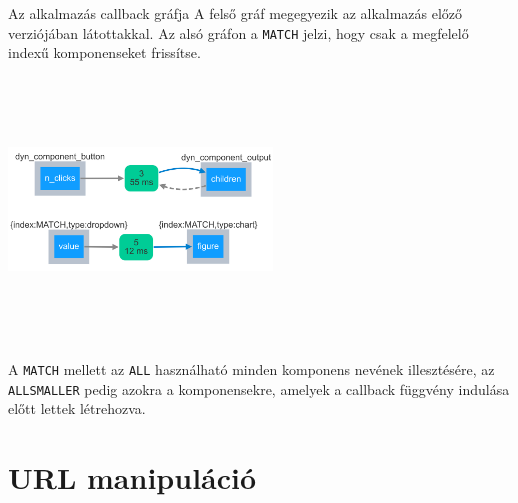 \documentclass[english, aspectratio=169]{beamer}
\makeatletter
\let\origtableofcontents=\tableofcontents
\def\tableofcontents{\@ifnextchar[{\origtableofcontents}{\gobbletableofcontents}}
\def\gobbletableofcontents#1{\origtableofcontents}
\makeatother
\begin{document}
\begin{frame}{Az alkalmazás callback gráfja}
	A felső gráf megegyezik az alkalmazás előző verziójában látottakkal. Az alsó gráfon a \texttt{MATCH} jelzi, hogy csak a megfelelő indexű komponenseket frissítse.\par\medskip
	\begin{center}
		\includegraphics[width=7cm, height=7cm, keepaspectratio]{images/adv_4.png}
	\end{center}
	\par\medskip
	A \texttt{MATCH} mellett az \texttt{ALL} használható minden komponens nevének illesztésére, az \texttt{ALLSMALLER} pedig azokra a komponensekre, amelyek a callback függvény indulása előtt lettek létrehozva.
\end{frame}

\section{URL manipuláció}

\begin{frame}
	\tableofcontents[currentsection]
\end{frame}
\end{document}
